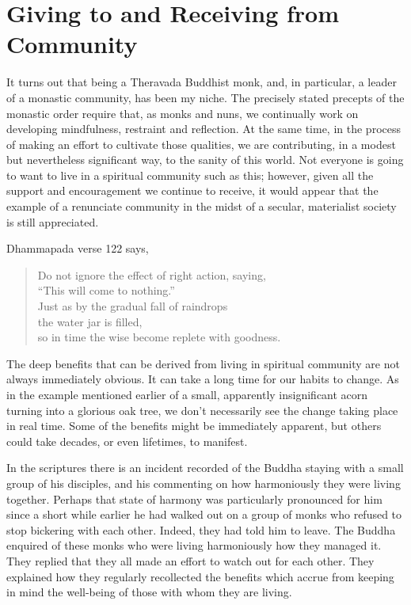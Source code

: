 \section{Giving to and Receiving from Community}

It turns out that being a Theravada Buddhist monk, and, in particular, a
leader of a monastic community, has been my niche. The precisely stated
precepts of the monastic order require that, as monks and nuns, we
continually work on developing mindfulness, restraint and reflection. At
the same time, in the process of making an effort to cultivate those
qualities, we are contributing, in a modest but nevertheless significant
way, to the sanity of this world. Not everyone is going to want to live
in a spiritual community such as this; however, given all the support
and encouragement we continue to receive, it would appear that the
example of a renunciate community in the midst of a secular, materialist
society is still appreciated.

Dhammapada verse 122 says,

\begin{quote}
  Do not ignore the effect of right action, saying,\\
  ``This will come to nothing.''\\
  Just as by the gradual fall of raindrops\\
  the water jar is filled,\\
  so in time the wise become replete with goodness.
\end{quote}

The deep benefits that can be derived from living in spiritual community
are not always immediately obvious. It can take a long time for our
habits to change. As in the example mentioned earlier of a small,
apparently insignificant acorn turning into a glorious oak tree, we
don't necessarily see the change taking place in real time. Some of the
benefits might be immediately apparent, but others could take decades,
or even lifetimes, to manifest.

In the scriptures there is an incident recorded of the Buddha staying
with a small group of his disciples, and his commenting on how
harmoniously they were living together. Perhaps that state of harmony
was particularly pronounced for him since a short while earlier he had
walked out on a group of monks who refused to stop bickering with each
other. Indeed, they had told him to leave. The Buddha enquired of these
monks who were living harmoniously how they managed it. They replied
that they all made an effort to watch out for each other. They explained
how they regularly recollected the benefits which accrue from keeping in
mind the well-being of those with whom they are living.

